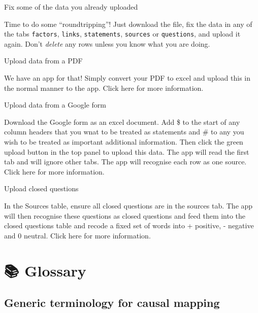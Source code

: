 \documentclass[
]{book}
\begin{document}
Fix some of the data you already uploaded

Time to do some ``roundtripping''! Just download the file, fix the data in any of the tabs \texttt{factors}, \texttt{links}, \texttt{statements}, \texttt{sources} or \texttt{questions}, and upload it again. Don't \emph{delete} any rows unless you know what you are doing.

Upload data from a PDF

We have an app for that! Simply convert your PDF to excel and upload this in the normal manner to the app. Click here for more information.

Upload data from a Google form

Download the Google form as an excel document. Add \$ to the start of any column headers that you wnat to be treated as statements and \# to any you wish to be treated as important additional information. Then click the green upload button in the top panel to upload this data. The app will read the first tab and will ignore other tabs. The app will recognise each row as one source. Click here for more information.

Upload closed questions

In the Sources table, ensure all closed questions are in the sources tab. The app will then recognise these questions as closed questions and feed them into the closed questions table and recode a fixed set of words into + positive, - negative and 0 neutral. Click here for more information.

\hypertarget{glossary}{%
\chapter{📚 Glossary}\label{glossary}}

\hypertarget{generic-terminology-for-causal-mapping}{%
\section{Generic terminology for causal mapping}\label{generic-terminology-for-causal-mapping}}
\end{document}
